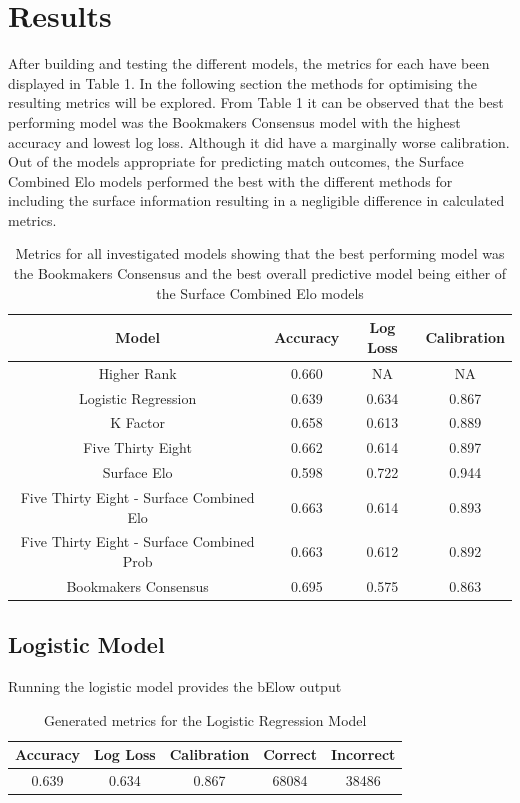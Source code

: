 \documentclass[12pt,a4paper]{article}
\begin{document}
\section{Results}
After building and testing the different models, the metrics for each have been displayed
in Table 1. In the following section the methods for optimising the resulting metrics
will be explored. From Table 1 it can be observed that the best performing model was the
Bookmakers Consensus model with the highest accuracy and lowest log loss. Although it did
have a marginally worse calibration. Out of the models appropriate for predicting match
outcomes, the Surface Combined Elo models performed the best with the different methods for
including the surface information resulting in a negligible difference in calculated metrics.
\begin{table}[h]
  \begin{tabular}{||c c c c||}
    \hline
    Model                                     & Accuracy & Log Loss & Calibration \\
    \hline\hline
    Higher Rank                               & 0.660    & NA       & NA          \\
    Logistic Regression                       & 0.639    & 0.634    & 0.867       \\
    K Factor                                  & 0.658    & 0.613    & 0.889       \\
    Five Thirty Eight                         & 0.662    & 0.614    & 0.897       \\
    Surface Elo                               & 0.598    & 0.722    & 0.944       \\
    Five Thirty Eight - Surface Combined Elo  & 0.663    & 0.614    & 0.893       \\
    Five Thirty Eight - Surface Combined Prob & 0.663    & 0.612    & 0.892       \\
    Bookmakers Consensus                      & 0.695    & 0.575    & 0.863       \\
    \hline
  \end{tabular}
  \caption{Metrics for all investigated models showing that the best performing model was
    the Bookmakers Consensus and the best overall predictive model being either of the
    Surface Combined Elo models}
\end{table}
\subsection{Logistic Model}
Running the logistic model provides the bElow output
\begin{table}[h]
  \centering
  \begin{tabular}{||c c c c c||}
    \hline
    Accuracy & Log Loss & Calibration & Correct & Incorrect \\
    \hline\hline
    0.639    & 0.634    & 0.867       & 68084   & 38486     \\
    \hline
  \end{tabular}
  \caption{Generated metrics for the Logistic Regression Model}
\end{table}
\end{document}
